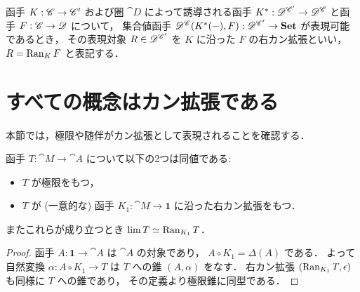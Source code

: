 \documentclass[titlepage]{ltjsreport}
\begin{document}
\begin{definition}
  \def\C{\cat{C}}%
  \def\A{\cat{C'}}%
  \def\D{\cat{D}}%
  \def\K{K}%
  \def\F{F}%
  函手 $\mrp{\K}{\C}{\A}$ および圏 $\D$ によって誘導される函手
  $\mrp{\K^*}{\D^\A}{\D^\C}$ と函手 $\mrp{\F}{\C}{\D}$ について，
  集合値函手 $\mrp{\mrps{\D^\C}{\K^*(-)}{\F}}{\D^\A}{\set}$ が表現可能であるとき，
  その表現対象 $R\in\objs{\D^\A}$ を $\K$ に沿った $\F$ の右カン拡張といい，
  $R=\ran_{\K}\F$ と表記する．
  \begin{center}
    
  \end{center}
\end{definition}

\section{すべての概念はカン拡張である}

本節では，極限や随伴がカン拡張として表現されることを確認する．

\begin{theorem}[極限は右カン拡張である]\label{thm:limit-is-right-kan-extension}
  函手 $T:\cat{M}\to\cat{A}$ について以下の2つは同値である:
  \begin{itemize}
    \item $T$ が極限をもつ，
    \item $T$ が (一意的な) 函手 $K_1:\cat{M}\to\mathbf{1}$
          に沿った右カン拡張をもつ．
  \end{itemize}
  またこれらが成り立つとき $\lim T\simeq\operatorname{Ran}_{K_1}T$．
\end{theorem}

\begin{proof}
  函手 $A:\mathbf{1}\to\cat{A}$ は $\cat{A}$ の対象であり，
  $A\circ K_1=\Delta(A)$ である．
  よって自然変換 $\alpha:A\circ K_1\to T$ は $T$ への錐 $(A,\alpha)$ をなす．
  右カン拡張 $(\operatorname{Ran}_{K_1}T,\epsilon)$ も同様に $T$ への錐であり，
  その定義より極限錐に同型である．
\end{proof}

\begin{center}
  \begin{minipage}[b]{0.4\linewidth}
    
  \end{minipage}
  \begin{minipage}[b]{0.4\linewidth}
    
  \end{minipage}
\end{center}
\end{document}
